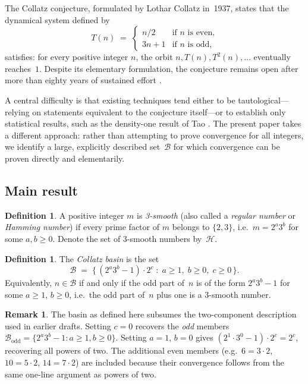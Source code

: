 \documentclass[12pt]{amsart}
\theoremstyle{definition}
\newtheorem{definition}[theorem]{Definition}
\newtheorem{remark}[theorem]{Remark}
\newcommand{\basin}{\mathcal{B}}
\newcommand{\smooth}{\mathcal{H}}  %
\begin{document}
The Collatz conjecture, formulated by Lothar Collatz in~1937, states that the
dynamical system defined by
\[
  T(n) \;=\;
  \begin{cases}
    n/2      & \text{if } n \text{ is even,} \\
    3n + 1   & \text{if } n \text{ is odd,}
  \end{cases}
\]
satisfies: for every positive integer $n$, the orbit
$n, T(n), T^2(n), \ldots$ eventually reaches~$1$.
Despite its elementary formulation, the conjecture remains open after more than
eighty years of sustained effort \cite{Lagarias2010, Tao2022}.

A central difficulty is that existing techniques tend either to be
tautological---relying on statements equivalent to the conjecture itself---or
to establish only statistical results, such as the density-one result of Tao
\cite{Tao2022}.  The present paper takes a different approach: rather than
attempting to prove convergence for all integers, we identify a large,
explicitly described set~$\basin$ for which convergence can be proven directly
and elementarily.

\subsection*{Main result}

\begin{definition}
  A positive integer $m$ is \emph{3-smooth} (also called a \emph{regular
  number} or \emph{Hamming number}) if every prime factor of $m$ belongs to
  $\{2, 3\}$, i.e.\ $m = 2^a 3^b$ for some $a, b \geq 0$.
  Denote the set of 3-smooth numbers by~$\smooth$.
\end{definition}

\begin{definition}
  The \emph{Collatz basin} is the set
  \[
    \basin
    \;=\;
    \bigl\{\, (2^a 3^b - 1) \cdot 2^c \;:\; a \geq 1,\; b \geq 0,\; c \geq 0 \,\bigr\}.
  \]
  Equivalently, $n \in \basin$ if and only if the odd part of~$n$ is of the
  form $2^a 3^b - 1$ for some $a \geq 1$, $b \geq 0$, i.e.\ the odd part
  of~$n$ plus one is a 3-smooth number.
\end{definition}

\begin{remark}
  The basin as defined here subsumes the two-component description used in
  earlier drafts.  Setting $c = 0$ recovers the \emph{odd} members
  $\basin_{\mathrm{odd}} = \{2^a 3^b - 1 : a \geq 1, b \geq 0\}$.
  Setting $a = 1$, $b = 0$ gives $(2^1 \cdot 3^0 - 1) \cdot 2^c = 2^c$,
  recovering all powers of two.
  The additional even members (e.g.\ $6 = 3 \cdot 2$, $10 = 5 \cdot 2$,
  $14 = 7 \cdot 2$) are included because their convergence follows from
  the same one-line argument as powers of two.
\end{remark}
\end{document}
